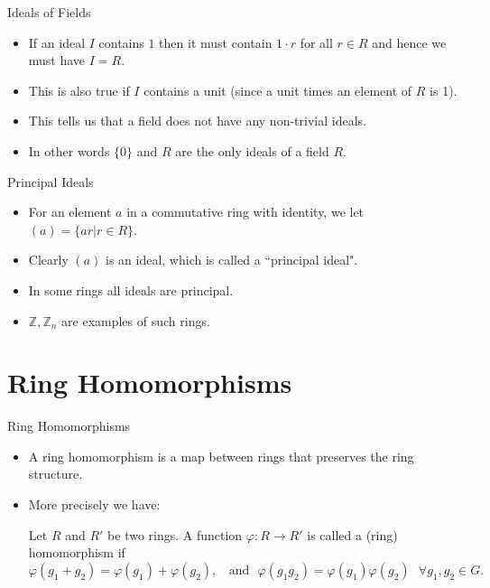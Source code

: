\documentclass[ %
 10pt, xcolor={dvipsnames,svgnames,x11names,hyperref},
   hyperref={colorlinks=true,citecolor=green,linkcolor=DarkRed,urlcolor=ProcessBlue,anchorcolor=blue}
  ]{beamer}
\newenvironment{stepitemize}{\begin{itemize}[<+->]}{\end{itemize} }
\newcommand{\Z}{\mathbb{Z}}
\begin{document}
\begin{frame}{Ideals of Fields}
    \begin{stepitemize}
    \item If an ideal $I$ contains $1$ then it must contain $1\cdot r$ for all $r\in R$ and hence we must have $I=R$.
    \item This is also true if $I$ contains a unit (since a unit times an element of $R$ is 1).
    \item This tells us that a field does not have any non-trivial ideals.
    \item In other words $\{0\}$ and $R$ are the only ideals of a field $R$.
    \end{stepitemize}
\end{frame}
\begin{frame}{Principal Ideals}
\begin{stepitemize}
\item For an element $a$ in a commutative ring with identity, we let
$(a) = \{ar|r\in R\}$.
\item Clearly $(a)$ is an ideal, which is called a ``principal ideal".
\item In some rings all ideals are principal.
\item $\Z, \Z_n$ are examples of such rings.
\end{stepitemize}
\end{frame}

\section{Ring Homomorphisms}
\begin{frame}{Ring Homomorphisms}
    \begin{stepitemize}
    \item A ring homomorphism is a map between rings that preserves the ring structure.
    \item More precisely we have:
\begin{definition}
Let $R$ and $R'$ be two rings. A function $\varphi:R\rightarrow R'$ is called a (ring) homomorphism if
$$\varphi(g_1+g_2) = \varphi(g_1)+\varphi(g_2), \:\:\:\:\textrm{and}\:\:\: \varphi(g_1g_2) = \varphi(g_1)\varphi(g_2) \:\:\: \forall g_1, g_2 \in G.$$
\end{definition}
\end{stepitemize}
\end{frame}
\end{document}
